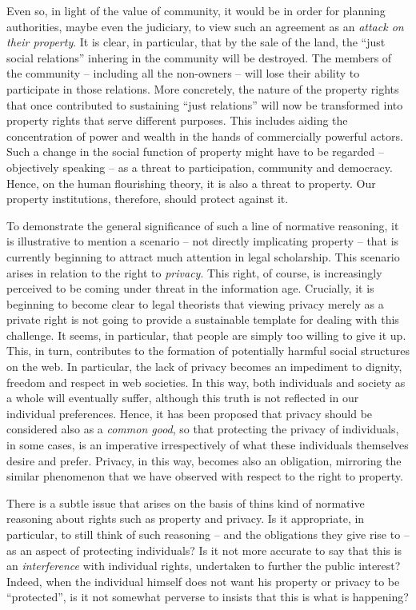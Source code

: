Even so, in light of the value of community, it would be in order for planning authorities, maybe even the judiciary, to view such an  agreement as an {\it attack on their property}. It is clear, in particular, that by the sale of the land, the ``just social relations'' inhering in the community will be destroyed. The members of the community -- including all the non-owners -- will lose their ability to participate in those relations. More concretely, the nature of the property rights that once contributed to sustaining ``just relations'' will now be transformed into property rights that serve different purposes. This includes aiding the concentration of power and wealth in the hands of commercially powerful actors. Such a change in the social function of property might have to be regarded -- objectively speaking -- as a threat to participation, community and democracy. Hence, on the human flourishing theory, it is also a threat to property. Our property institutions, therefore, should protect against it.

To demonstrate the general significance of such a line of normative reasoning, it is illustrative to mention a scenario -- not directly implicating property -- that is currently beginning to attract much attention in legal scholarship. This scenario arises in relation to the right to {\it privacy}. This right, of course, is increasingly perceived to be coming under threat in the information age. Crucially, it is beginning to become clear to legal theorists that viewing privacy merely as a private right is not going to provide a sustainable template for dealing with this challenge. It seems, in particular, that people are simply too willing to give it up. This, in turn, contributes to the formation of potentially harmful social structures on the web. In particular, the lack of privacy becomes an impediment to dignity, freedom and respect in web societies. In this way, both individuals and society as a whole will eventually suffer, although this truth is not reflected in our individual preferences. Hence, it has been proposed that privacy should be considered also as a {\it common good}, so that protecting the privacy of individuals, in some cases, is an imperative irrespectively of what these individuals themselves desire and prefer. Privacy, in this way, becomes also an obligation, mirroring the similar phenomenon that we have observed with respect to the right to property.

There is a subtle issue that arises on the basis of thins kind of normative reasoning about rights such as property and privacy. Is it appropriate, in particular, to still think of such reasoning -- and the obligations they give rise to -- as an aspect of protecting individuals? Is it not more accurate to say that this is an {\it interference} with individual rights, undertaken to further the public interest? Indeed, when the individual himself does not want his property or privacy to be ``protected'', is it not somewhat perverse to insists that this is what is happening? 

